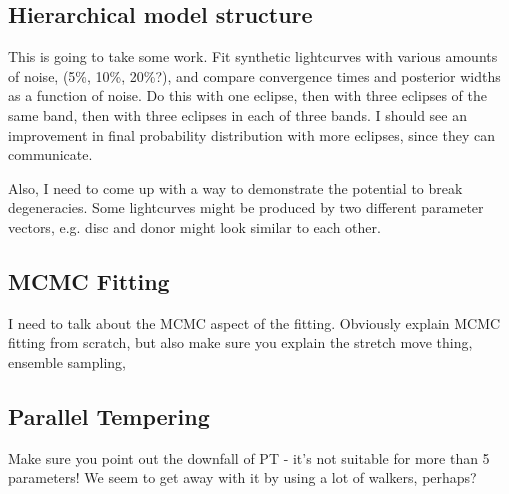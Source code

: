\subsection{Hierarchical model structure}
This is going to take some work. Fit synthetic lightcurves with various amounts of noise, (5\%, 10\%, 20\%?), and compare convergence times and posterior widths as a function of noise. Do this with one eclipse, then with three eclipses of the same band, then with three eclipses in each of three bands.
I should see an improvement in final probability distribution with more eclipses, since they can communicate.

Also, I need to come up with a way to demonstrate the potential to break degeneracies. Some lightcurves might be produced by two different parameter vectors, e.g. disc and donor might look similar to each other. 

\subsection{MCMC Fitting}
I need to talk about the MCMC aspect of the fitting. Obviously explain MCMC fitting from scratch, but also make sure you explain the stretch move thing, ensemble sampling, 

\subsection{Parallel Tempering}
Make sure you point out the downfall of PT - it's not suitable for more than 5 parameters! We seem to get away with it by using a lot of walkers, perhaps?



